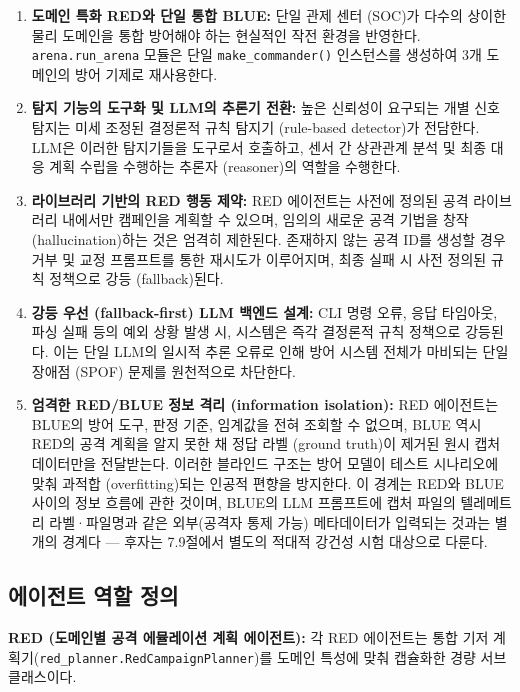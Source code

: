 \begin{enumerate}[leftmargin=*]
    \item \textbf{도메인 특화 RED와 단일 통합 BLUE:} 단일 관제 센터 (SOC)가 다수의 상이한 물리 도메인을 통합 방어해야 하는 현실적인 작전 환경을 반영한다. \texttt{arena.run\_arena} 모듈은 단일 \texttt{make\_commander()} 인스턴스를 생성하여 3개 도메인의 방어 기제로 재사용한다.
    \item \textbf{탐지 기능의 도구화 및 LLM의 추론기 전환:} 높은 신뢰성이 요구되는 개별 신호 탐지는 미세 조정된 결정론적 규칙 탐지기 (rule-based detector)가 전담한다. LLM은 이러한 탐지기들을 도구로서 호출하고, 센서 간 상관관계 분석 및 최종 대응 계획 수립을 수행하는 추론자 (reasoner)의 역할을 수행한다.
    \item \textbf{라이브러리 기반의 RED 행동 제약:} RED 에이전트는 사전에 정의된 공격 라이브러리 내에서만 캠페인을 계획할 수 있으며, 임의의 새로운 공격 기법을 창작 (hallucination)하는 것은 엄격히 제한된다. 존재하지 않는 공격 ID를 생성할 경우 거부 및 교정 프롬프트를 통한 재시도가 이루어지며, 최종 실패 시 사전 정의된 규칙 정책으로 강등 (fallback)된다.
    \item \textbf{강등 우선 (fallback-first) LLM 백엔드 설계:} CLI 명령 오류, 응답 타임아웃, 파싱 실패 등의 예외 상황 발생 시, 시스템은 즉각 결정론적 규칙 정책으로 강등된다. 이는 단일 LLM의 일시적 추론 오류로 인해 방어 시스템 전체가 마비되는 단일 장애점 (SPOF) 문제를 원천적으로 차단한다.
    \item \textbf{엄격한 RED/BLUE 정보 격리 (information isolation):} RED 에이전트는 BLUE의 방어 도구, 판정 기준, 임계값을 전혀 조회할 수 없으며, BLUE 역시 RED의 공격 계획을 알지 못한 채 정답 라벨 (ground truth)이 제거된 원시 캡처 데이터만을 전달받는다. 이러한 블라인드 구조는 방어 모델이 테스트 시나리오에 맞춰 과적합 (overfitting)되는 인공적 편향을 방지한다. 이 경계는 RED와 BLUE 사이의 정보 흐름에 관한 것이며, BLUE의 LLM 프롬프트에 캡처 파일의 텔레메트리 라벨·파일명과 같은 외부(공격자 통제 가능) 메타데이터가 입력되는 것과는 별개의 경계다 --- 후자는 7.9절에서 별도의 적대적 강건성 시험 대상으로 다룬다.
\end{enumerate}

\subsection{에이전트 역할 정의}

\textbf{RED (도메인별 공격 에뮬레이션 계획 에이전트):} 각 RED 에이전트는 통합 기저 계획기(\texttt{red\_planner.RedCampaignPlanner})를 도메인 특성에 맞춰 캡슐화한 경량 서브클래스이다.

